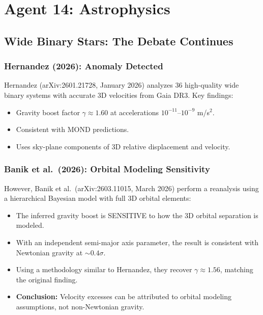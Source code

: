 \documentclass[11pt]{article}
\begin{document}
\section{Agent 14: Astrophysics}

\subsection{Wide Binary Stars: The Debate Continues}

\subsubsection{Hernandez (2026): Anomaly Detected}

Hernandez (arXiv:2601.21728, January 2026) analyzes 36 high-quality
wide binary systems with accurate 3D velocities from Gaia DR3. Key
findings:
\begin{itemize}
  \item Gravity boost factor $\gamma \approx 1.60$ at accelerations
    $10^{-11}$--$10^{-9}$ m/s$^2$.
  \item Consistent with MOND predictions.
  \item Uses sky-plane components of 3D relative displacement and
    velocity.
\end{itemize}

\subsubsection{Banik et al.\ (2026): Orbital Modeling Sensitivity}

However, Banik et al.\ (arXiv:2603.11015, March 2026) perform a
reanalysis using a hierarchical Bayesian model with full 3D orbital
elements:
\begin{itemize}
  \item The inferred gravity boost is SENSITIVE to how the 3D orbital
    separation is modeled.
  \item With an independent semi-major axis parameter, the result
    is consistent with Newtonian gravity at $\sim 0.4\sigma$.
  \item Using a methodology similar to Hernandez, they recover
    $\gamma \approx 1.56$, matching the original finding.
  \item \textbf{Conclusion:} Velocity excesses can be attributed
    to orbital modeling assumptions, not non-Newtonian gravity.
\end{itemize}
\end{document}
